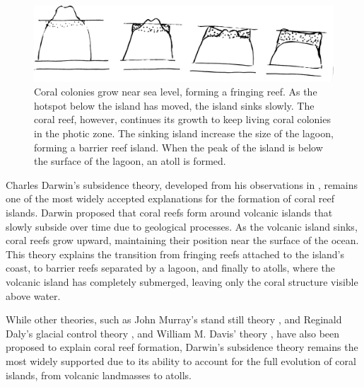 \begin{figure}[ht]
    \centering
    \includegraphics[width = \linewidth]{other_images/Drawings/Darwin_corals.jpg} %
    \caption{Coral colonies grow near sea level, forming a fringing reef. As the hotspot below the island has moved, the island sinks slowly. The coral reef, however, continues its growth to keep living coral colonies in the photic zone. The sinking island increase the size of the lagoon, forming a barrier reef island. When the peak of the island is below the surface of the lagoon, an atoll is formed. }
    \label{fig:coral-island-reef-growth}
\end{figure}
% 
Charles Darwin's subsidence theory, developed from his observations in \citep{Darwin1842}, remains one of the most widely accepted explanations for the formation of coral reef islands. Darwin proposed that coral reefs form around volcanic islands that slowly subside over time due to geological processes. As the volcanic island sinks, coral reefs grow upward, maintaining their position near the surface of the ocean. This theory explains the transition from fringing reefs attached to the island's coast, to barrier reefs separated by a lagoon, and finally to atolls, where the volcanic island has completely submerged, leaving only the coral structure visible above water.

While other theories, such as John Murray's stand still theory \cite{Murray1880}, and Reginald Daly's glacial control theory \cite{Daly1915}, and William M. Davis' theory \cite{Davis1928}, have also been proposed to explain coral reef formation, Darwin's subsidence theory remains the most widely supported due to its ability to account for the full evolution of coral islands, from volcanic landmasses to atolls. 

